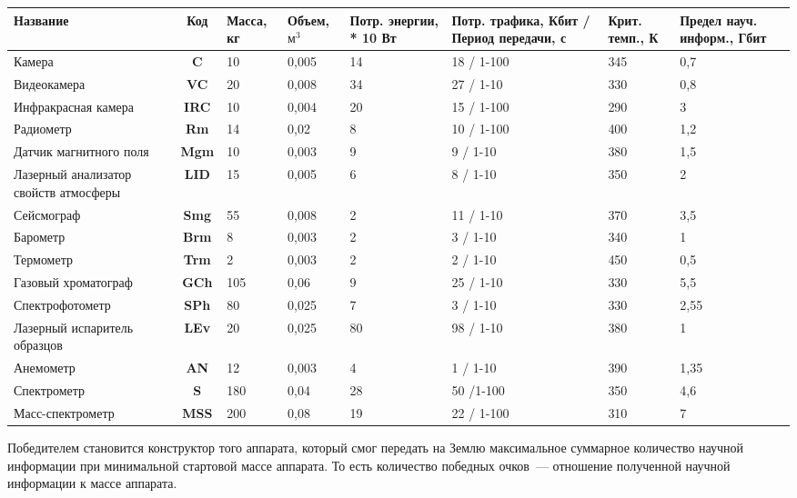 \documentclass[12pt,a4paper]{article}
\begin{document}
\begin{center}
\begin{tabular}{ |p{3cm}|c|p{1.5cm}|p{1.5cm}|p{1.5cm}|p{2cm}|p{1.5cm}|p{1.5cm}| } 
  \hline
  \textbf{Название} & \textbf{Код} & \textbf{Масса, кг} & \textbf{Объем, $\text{м}^3$} &
  \textbf{Потр. энергии, * 10 Вт} & \textbf{Потр. трафика, Кбит / Период передачи,
    с} & \textbf{Крит. темп., К} & \textbf{Предел науч. информ., Гбит}\\
  \hline
  Камера & \textbf{C} & 10 & 0,005 & 14 & 18 / 1-100 & 345 & 0,7\\
  \hline
  Видеокамера & \textbf{VC} & 20 & 0,008 & 34 & 27 / 1-10 & 330 & 0,8\\
  \hline
  Инфракрасная камера & \textbf{IRC} & 10 & 0,004 & 20 & 15 / 1-100 & 290 & 3\\ 
  \hline
  Радиометр & \textbf{Rm} & 14 & 0,02 & 8 & 10 / 1-100 & 400 & 1,2\\
  \hline
  Датчик магнитного поля & \textbf{Mgm} & 10 & 0,003 & 9 & 9 / 1-10 & 380 & 1,5\\ 
  \hline
  Лазерный анализатор свойств атмосферы & \textbf{LID} & 15 & 0,005 & 6 & 8 / 1-10 & 350 &
  2\\
  \hline
  Сейсмограф & \textbf{Smg} & 55 & 0,008 & 2 & 11 / 1-10 & 370 & 3,5\\
  \hline
  Барометр & \textbf{Brm} & 8 & 0,003 & 2 & 3 / 1-10 & 340 & 1\\
  \hline
  Термометр & \textbf{Trm} & 2 & 0,003 & 2 & 2 / 1-10 & 450 & 0,5\\
  \hline
  Газовый хроматограф & \textbf{GCh} & 105 & 0,06 & 9 & 25 / 1-10 & 330 & 5,5\\
  \hline
  Спект\-ро\-фо\-то\-метр & \textbf{SPh} & 80 & 0,025 & 7 & 3 / 1-10 & 330 & 2,55\\
  \hline
  Лазерный испаритель образцов & \textbf{LEv} & 20 & 0,025 & 80 & 98 / 1-10 & 380 & 1\\
  \hline
  Анемометр & \textbf{AN} & 12 & 0,003 & 4 & 1 / 1-10 & 390 & 1,35 \\
  \hline
  Спектрометр & \textbf{S} & 180 & 0,04 & 28 & 50 /1-100 & 350 & 4,6\\
  \hline
  Масс-спектрометр & \textbf{MSS} & 200 & 0,08 & 19 & 22 / 1-100 & 310 & 7\\
  \hline
\end{tabular}
\end{center}

Победителем становится конструктор того аппарата, который смог передать на Землю
максимальное суммарное количество научной информации при минимальной стартовой массе
аппарата. То есть количество победных очков~--- отношение полученной научной информации к
массе аппарата.
\end{document}
